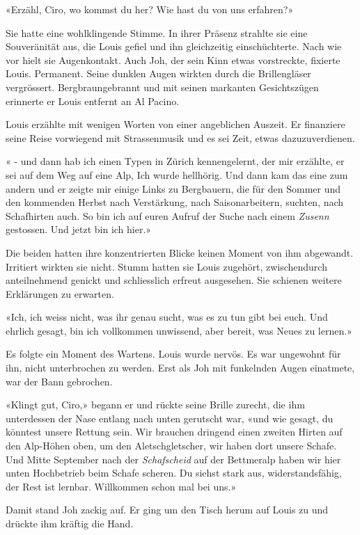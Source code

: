 «Erzähl, Ciro, wo kommst du her? Wie hast du von uns erfahren?»

Sie hatte eine wohlklingende Stimme. In ihrer Präsenz strahlte sie eine
Souveränität aus, die Louis gefiel und ihn gleichzeitig einschüchterte.
Nach wie vor hielt sie Augenkontakt. Auch Joh, der sein Kinn etwas
vorstreckte, fixierte Louis. Permanent. Seine dunklen Augen wirkten
durch die Brillengläser vergrössert. Bergbraungebrannt und mit seinen
markanten Gesichtszügen erinnerte er Louis entfernt an Al Pacino. 

Louis erzählte mit wenigen Worten von einer angeblichen Auszeit. Er finanziere seine Reise vorwiegend mit Strassenmusik und es sei Zeit, etwas dazuzuverdienen.

« - und dann hab ich einen Typen in Zürich kennengelernt, der mir
erzählte, er sei auf dem Weg auf eine Alp, Ich wurde hellhörig. Und dann kam das eine zum
andern und er zeigte mir einige Links zu Bergbauern, die für den Sommer und den
kommenden Herbst nach Verstärkung, nach Saisonarbeitern, suchten, nach Schafhirten auch. So
bin ich auf euren Aufruf der Suche nach einem \emph{Zusenn} gestossen.
Und jetzt bin ich hier.»

Die beiden hatten ihre konzentrierten Blicke keinen Moment von ihm
abgewandt. Irritiert wirkten sie nicht. Stumm hatten sie Louis zugehört,
zwischendurch anteilnehmend genickt und schliesslich erfreut ausgesehen.
Sie schienen weitere Erklärungen zu erwarten.

«Ich, ich weiss nicht, was ihr genau sucht, was es zu tun gibt bei euch.
Und ehrlich gesagt, bin ich vollkommen unwissend, aber bereit, was Neues
zu lernen.»

Es folgte ein Moment des Wartens. Louis wurde nervös. Es war
ungewohnt für ihn, nicht unterbrochen zu werden. Erst als
Joh mit funkelnden Augen einatmete, war der Bann gebrochen.

«Klingt gut, Ciro,» begann er und rückte seine Brille zurecht, die ihm
unterdessen der Nase entlang nach unten gerutscht war, «und wie gesagt,
du könntest unsere Rettung sein. Wir brauchen dringend einen zweiten
Hirten auf den Alp-Höhen oben, um den Aletschgletscher, wir haben dort
unsere Schafe. Und Mitte September nach der \emph{Schafscheid} auf der
Bettmeralp haben wir hier unten Hochbetrieb beim Schafe scheren. Du
siehst stark aus, widerstandsfähig, der Rest ist lernbar. Willkommen
schon mal bei uns.»

Damit stand Joh zackig auf. Er ging um den Tisch herum auf Louis zu und
drückte ihm kräftig die Hand.

